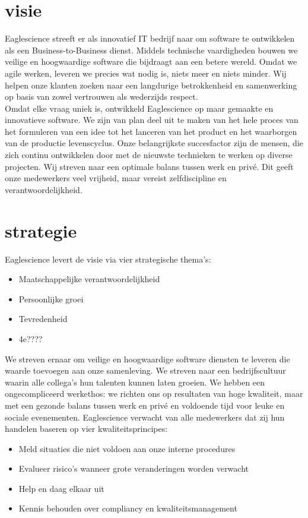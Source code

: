 \section{visie}\label{sec:visie}
Eaglescience streeft er als innovatief IT bedrijf naar om software te ontwikkelen als een Business-to-Business dienst.
Middels technische vaardigheden bouwen we veilige en hoogwaardige software die bijdraagt aan een betere wereld.
Omdat we agile werken, leveren we precies wat nodig is, niets meer en niets minder.
Wij helpen onze klanten zoeken naar een langdurige betrokkenheid en samenwerking op basis van zowel vertrouwen als wederzijds respect. \\
Omdat elke vraag uniek is, ontwikkeld Eaglescience op maar gemaakte en innovatieve software.
We zijn van plan deel uit te maken van het hele proces van het formuleren van een idee tot het lanceren van het product en het waarborgen van de productie levenscyclus.
Onze belangrijkste succesfactor zijn de mensen, die zich continu ontwikkelen door met de nieuwste technieken te werken op diverse projecten.
Wij streven naar een optimale balans tussen werk en privé.
Dit geeft onze medewerkers veel vrijheid, maar vereist zelfdiscipline en verantwoordelijkheid.

\section{strategie}\label{sec:strategie}
Eaglescience levert de visie via vier strategische thema's:
\begin{itemize}
    \item Maatschappelijke verantwoordelijkheid
    \item Persoonlijke groei
    \item Tevredenheid
    \item 4e???? %
\end{itemize}
We streven ernaar om veilige en hoogwaardige software diensten te leveren die waarde toevoegen aan onze samenleving.
We streven naar een bedrijfscultuur waarin alle collega's hun talenten kunnen laten groeien.
We hebben een ongecompliceerd werkethos: we richten ons op resultaten van hoge kwaliteit, maar met een gezonde balans tussen werk en privé en voldoende tijd voor leuke en sociale evenementen.
Eaglescience verwacht van alle medewerkers dat zij hun handelen baseren op vier kwaliteitsprincipes:
\begin{itemize}
    \item Meld situaties die niet voldoen aan onze interne procedures
    \item Evalueer risico's wanneer grote veranderingen worden verwacht
    \item Help en daag elkaar uit
    \item Kennis behouden over compliancy en kwaliteitsmanagement
\end{itemize}

